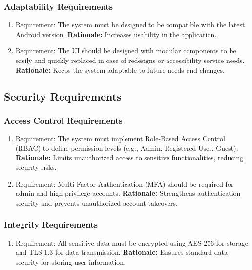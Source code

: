 \documentclass[]{article}
\begin{document}
\subsubsection{Adaptability Requirements} \label{ssub:adaptability_requirements} \begin{enumerate}[{MS-A}1. ] \item Requirement: The system must be designed to be compatible with the latest Android version. 
    \newline \textbf{Rationale:} Increases usability in the application. \item Requirement: The UI should be designed with modular components to be easily and quickly replaced in case of redesigns or accessibility service needs. 
    \newline \textbf{Rationale:} Keeps the system adaptable to future needs and changes. \end{enumerate} %
\subsection{Security Requirements} \label{sub:security_requirements} %
\subsubsection{Access Control Requirements} \label{ssub:access_control_requirements} %
\begin{enumerate}[{SR-AC}1. ] \item Requirement: The system must implement Role-Based Access Control (RBAC) to define permission levels (e.g., Admin, Registered User, Guest). 
    \newline \textbf{Rationale:} Limits unauthorized access to sensitive functionalities, reducing security risks.
     \item Requirement: Multi-Factor Authentication (MFA) should be required for admin and high-privilege accounts.
      \newline \textbf{Rationale:} Strengthens authentication security and prevents unauthorized account takeovers. \end{enumerate} %
\subsubsection{Integrity Requirements} \label{ssub:integrity_requirements} %
 \begin{enumerate}[{SR-INT}1. ] \item Requirement: All sensitive data must be encrypted using AES-256 for storage and TLS 1.3 for data transmission. \newline \textbf{Rationale:} Ensures standard data security for storing user information. \end{enumerate} %
\end{document}
